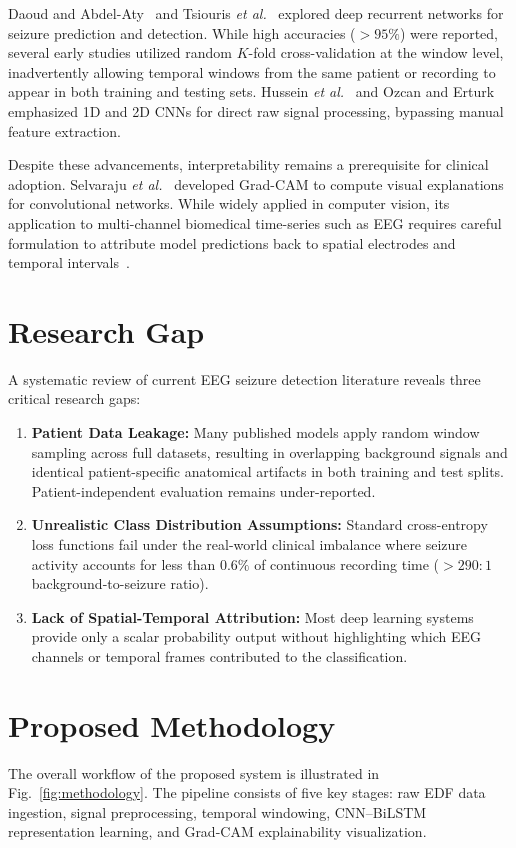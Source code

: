 \documentclass[conference]{IEEEtran}
\begin{document}
Daoud and Abdel-Aty~\cite{daoud2019efficient} and Tsiouris \textit{et al.}~\cite{tsiouris2018long} explored deep recurrent networks for seizure prediction and detection. While high accuracies ($>95\%$) were reported, several early studies utilized random $K$-fold cross-validation at the window level, inadvertently allowing temporal windows from the same patient or recording to appear in both training and testing sets. Hussein \textit{et al.}~\cite{hussein2019human} and Ozcan and Erturk~\cite{ozcan2019seizure} emphasized 1D and 2D CNNs for direct raw signal processing, bypassing manual feature extraction.

Despite these advancements, interpretability remains a prerequisite for clinical adoption. Selvaraju \textit{et al.}~\cite{selvaraju2017grad} developed Grad-CAM to compute visual explanations for convolutional networks. While widely applied in computer vision, its application to multi-channel biomedical time-series such as EEG requires careful formulation to attribute model predictions back to spatial electrodes and temporal intervals~\cite{covert2022explaining, emami2022deep}.

\section{Research Gap}
A systematic review of current EEG seizure detection literature reveals three critical research gaps:
\begin{enumerate}
    \item \textbf{Patient Data Leakage:} Many published models apply random window sampling across full datasets, resulting in overlapping background signals and identical patient-specific anatomical artifacts in both training and test splits. Patient-independent evaluation remains under-reported.
    \item \textbf{Unrealistic Class Distribution Assumptions:} Standard cross-entropy loss functions fail under the real-world clinical imbalance where seizure activity accounts for less than $0.6\%$ of continuous recording time ($>290:1$ background-to-seizure ratio).
    \item \textbf{Lack of Spatial-Temporal Attribution:} Most deep learning systems provide only a scalar probability output without highlighting which EEG channels or temporal frames contributed to the classification.
\end{enumerate}

\section{Proposed Methodology}
The overall workflow of the proposed system is illustrated in Fig.~\ref{fig:methodology}. The pipeline consists of five key stages: raw EDF data ingestion, signal preprocessing, temporal windowing, CNN--BiLSTM representation learning, and Grad-CAM explainability visualization.
\end{document}
